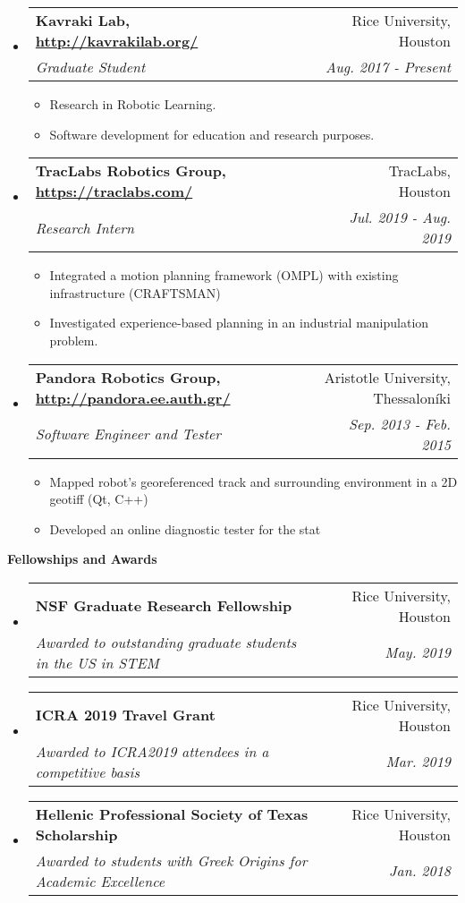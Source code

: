 \documentclass[letterpaper,11pt]{article}
\makeatletter
\newcommand{\resitem}[1]{\item #1 \vspace{-2pt}}
\newcommand{\resheading}[1]{{\large \colorbox{mygrey}{\begin{minipage}{\textwidth}{\textbf{#1 \vphantom{p\^{E}}}}\end{minipage}}}}
\newcommand{\ressubheading}[4]{
\begin{tabular*}{7.0in}{l@{\extracolsep{\fill}}r}
		\textbf{#1} & #2 \\
		\textit{#3} & \textit{#4} \\
\end{tabular*}\vspace{-6pt}}
\makeatother
\begin{document}
\begin{itemize}
	
    \item
        \ressubheading{Kavraki Lab, \url{http://kavrakilab.org/}}
	{Rice University, Houston}{Graduate Student}
	{Aug. 2017 - Present  }
	\begin{itemize}
		\resitem{Research in Robotic Learning. \cite{Chamzas2019,Chamzas2020,Pairet2021, Chamzas2021} }
		\resitem{Software development for education and research purposes. }
	\end{itemize}
    \item
    \ressubheading{TracLabs Robotics Group, \url{https://traclabs.com/}}
    {TracLabs, Houston}{Research Intern}
    {Jul. 2019 - Aug. 2019}
    \begin{itemize}
    	\resitem{Integrated a motion planning framework (OMPL) with existing infrastructure (CRAFTSMAN)}
    \resitem{Investigated experience-based planning in an industrial manipulation problem.}
    \end{itemize}
	\item
     \ressubheading{Pandora Robotics Group, \url{http://pandora.ee.auth.gr/}}
	{Aristotle University, Thessaloníki}{Software Engineer and Tester}
	{Sep. 2013 - Feb. 2015}
	\begin{itemize}
		\resitem{Mapped robot’s georeferenced track and surrounding environment in a 2D geotiff (Qt, C++)}
		\resitem{Developed an online diagnostic tester for the stat}
	\end{itemize}
\end{itemize}

\resheading{Fellowships and Awards}
\begin{itemize}
		\item
	\ressubheading{NSF Graduate Research Fellowship}
	{Rice University, Houston}{Awarded to outstanding graduate students in the US in STEM }{May. 2019}
		\item
		\ressubheading{ICRA 2019 Travel Grant}
		{Rice University, Houston}{Awarded to ICRA2019 attendees in a competitive basis }{Mar. 2019}
		\item
		\ressubheading{Hellenic Professional Society of Texas Scholarship}
		{Rice University, Houston}{Awarded to students with Greek Origins for Academic Excellence}
		{Jan. 2018}
\end{itemize}
\end{document}
